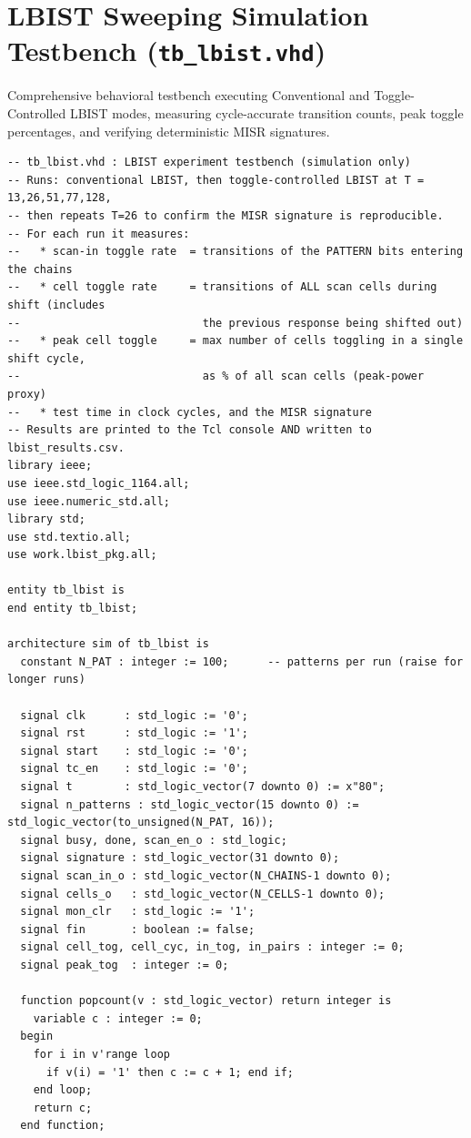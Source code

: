 \documentclass[conference]{IEEEtran}
\begin{document}
\section{LBIST Sweeping Simulation Testbench (\texttt{tb\_lbist.vhd})}
\label{app:tb_lbist}
Comprehensive behavioral testbench executing Conventional and Toggle-Controlled LBIST modes, measuring cycle-accurate transition counts, peak toggle percentages, and verifying deterministic MISR signatures.

\begin{lstlisting}[style=vhdlstyle, caption={LBIST Sweeping Simulation Testbench (\texttt{tb\_lbist.vhd})}]
-- tb_lbist.vhd : LBIST experiment testbench (simulation only)
-- Runs: conventional LBIST, then toggle-controlled LBIST at T = 13,26,51,77,128,
-- then repeats T=26 to confirm the MISR signature is reproducible.
-- For each run it measures:
--   * scan-in toggle rate  = transitions of the PATTERN bits entering the chains
--   * cell toggle rate     = transitions of ALL scan cells during shift (includes
--                            the previous response being shifted out)
--   * peak cell toggle     = max number of cells toggling in a single shift cycle,
--                            as % of all scan cells (peak-power proxy)
--   * test time in clock cycles, and the MISR signature
-- Results are printed to the Tcl console AND written to lbist_results.csv.
library ieee;
use ieee.std_logic_1164.all;
use ieee.numeric_std.all;
library std;
use std.textio.all;
use work.lbist_pkg.all;

entity tb_lbist is
end entity tb_lbist;

architecture sim of tb_lbist is
  constant N_PAT : integer := 100;      -- patterns per run (raise for longer runs)

  signal clk      : std_logic := '0';
  signal rst      : std_logic := '1';
  signal start    : std_logic := '0';
  signal tc_en    : std_logic := '0';
  signal t        : std_logic_vector(7 downto 0) := x"80";
  signal n_patterns : std_logic_vector(15 downto 0) := std_logic_vector(to_unsigned(N_PAT, 16));
  signal busy, done, scan_en_o : std_logic;
  signal signature : std_logic_vector(31 downto 0);
  signal scan_in_o : std_logic_vector(N_CHAINS-1 downto 0);
  signal cells_o   : std_logic_vector(N_CELLS-1 downto 0);
  signal mon_clr   : std_logic := '1';
  signal fin       : boolean := false;
  signal cell_tog, cell_cyc, in_tog, in_pairs : integer := 0;
  signal peak_tog  : integer := 0;

  function popcount(v : std_logic_vector) return integer is
    variable c : integer := 0;
  begin
    for i in v'range loop
      if v(i) = '1' then c := c + 1; end if;
    end loop;
    return c;
  end function;


\end{lstlisting}
\end{document}
